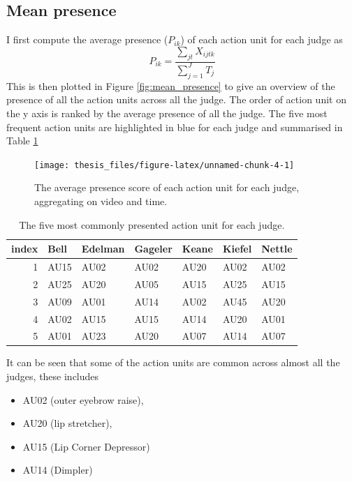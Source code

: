 \documentclass{monashthesis}
\begin{document}
\hypertarget{mean-presence}{%
\subsection{Mean presence}\label{mean-presence}}

I first compute the average presence (\(P_{ik}\)) of each action unit for each judge as \[P_{ik} = \frac{\sum_{jt}X_{ijtk}}{\sum_{j = 1}^JT_j}\] This is then plotted in Figure \ref{fig:mean_presence} to give an overview of the presence of all the action units across all the judge. The order of action unit on the y axis is ranked by the average presence of all the judge. The five most frequent action units are highlighted in blue for each judge and summarised in Table \ref{tab:most_common}

\begin{figure}
\texttt{[image: thesis\_files/figure-latex/unnamed-chunk-4-1]} \caption{The average presence score of each action unit for each judge, aggregating on video and time. \label{fig:mean_presence}}\label{fig:unnamed-chunk-4}
\end{figure}

\begin{table}[t]

\caption{\label{tab:unnamed-chunk-5}\label{tab:most_common}The five most commonly presented action unit for each judge.}
\centering
\begin{tabular}{r|l|l|l|l|l|l}
\hline
index & Bell & Edelman & Gageler & Keane & Kiefel & Nettle\\
\hline
1 & AU15 & AU02 & AU02 & AU20 & AU02 & AU02\\
\hline
2 & AU25 & AU20 & AU05 & AU15 & AU25 & AU15\\
\hline
3 & AU09 & AU01 & AU14 & AU02 & AU45 & AU20\\
\hline
4 & AU02 & AU15 & AU15 & AU14 & AU20 & AU01\\
\hline
5 & AU01 & AU23 & AU20 & AU07 & AU14 & AU07\\
\hline
\end{tabular}
\end{table}

It can be seen that some of the action units are common across almost all the judges, these includes

\begin{itemize}
\tightlist
\item
  AU02 (outer eyebrow raise),
\item
  AU20 (lip stretcher),
\item
  AU15 (Lip Corner Depressor)
\item
  AU14 (Dimpler)
\end{itemize}
\end{document}

